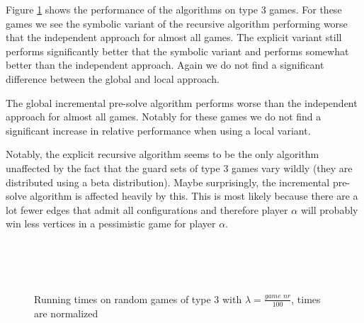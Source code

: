 Figure \ref{fig:results_type3} shows the performance of the algorithms on type 3 games. For these games we see the symbolic variant of the recursive algorithm performing worse that the independent approach for almost all games. The explicit variant still performs significantly better that the symbolic variant and performs somewhat better than the independent approach. Again we do not find a significant difference between the global and local approach.

The global incremental pre-solve algorithm performs worse than the independent approach for almost all games. Notably for these games we do not find a significant increase in relative performance when using a local variant.

Notably, the explicit recursive algorithm seems to be the only algorithm unaffected by the fact that the guard sets of type 3 games vary wildly (they are distributed using a beta distribution). Maybe surprisingly, the incremental pre-solve algorithm is affected heavily by this. This is most likely because there are a lot fewer edges that admit all configurations and therefore player $\alpha$ will probably win less vertices in a pessimistic game for player $\alpha$.

\begin{figure}[H]
	\centering
	\begin{multicols}{2}
		\\\vfill
		\\
		\\\vfill
		
	\end{multicols}
	\caption{Running times on random games of type 3 with $\lambda = \frac{\textit{game nr}}{100}$, times are normalized}
	\label{fig:results_type3}
\end{figure}%

